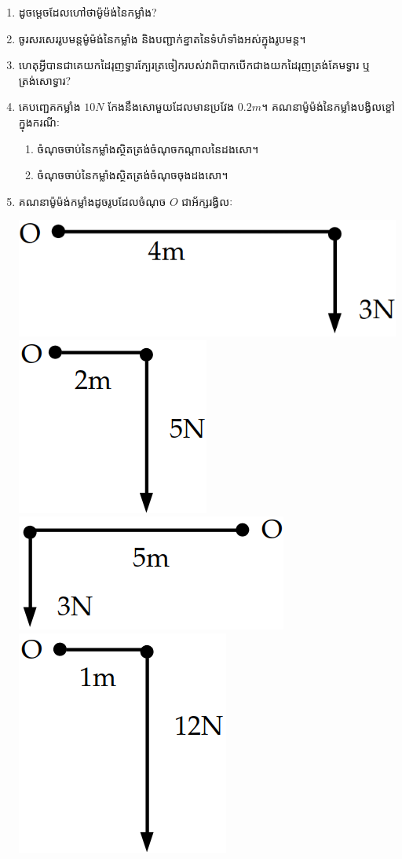 \documentclass{officialexam}
\begin{document}
	\begin{enumerate}[m]
		\item ដូចម្តេចដែលហៅថាម៉ូម៉ង់នៃកម្លាំង?
		\item ចូរសរសេររូបមន្តម៉ូម៉ង់នៃកម្លាំង និងបញ្ជាក់ខ្នាតនៃទំហំទាំងអស់ក្នុងរូបមន្ត។
		\item ហេតុអ្វីបានជាគេយកដៃរុញទ្វារក្បែរត្រចៀករបស់វាពិបាកបើកជាងយកដៃរុញត្រង់គែមទ្វារ ឬត្រង់សោទ្វារ?
		\item គេបញ្ជេគកម្លាំង $10N$ កែងនឹងសោមួយដែលមានប្រវែង $0.2m$។ គណនាម៉ូម៉ង់នៃកម្លាំងបង្វិលខ្ខៅក្នុងករណីៈ
		\begin{enumerate}[k]
			\item ចំណុចចាប់នៃកម្លាំងស្ថិតត្រង់ចំណុចកណ្តាលនៃដងសោ។
			\item ចំណុចចាប់នៃកម្លាំងស្ថិតត្រង់ចំណុចចុងដងសោ។
		\end{enumerate}
		\item គណនាម៉ូម៉ង់កម្លាំងដូចរូបដែលចំណុច $O$ ជាអ័ក្សរង្វិលៈ
		\begin{multicols}{4}
			\includegraphics[scale=0.25]{01}
			\includegraphics[scale=0.3]{02}
			\includegraphics[scale=0.3]{03}
			\includegraphics[scale=0.3]{04}

\end{multicols}
\end{enumerate}
\end{document}
